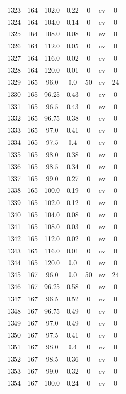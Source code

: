 \documentclass[12pt,a4paper]{article}
\begin{document}
\begin{tabular}{r|cccccc}
	1323 & 164 & 102.0 & 0.22 & 0 & ev & 0 \\
	1324 & 164 & 104.0 & 0.14 & 0 & ev & 0 \\
	1325 & 164 & 108.0 & 0.08 & 0 & ev & 0 \\
	1326 & 164 & 112.0 & 0.05 & 0 & ev & 0 \\
	1327 & 164 & 116.0 & 0.02 & 0 & ev & 0 \\
	1328 & 164 & 120.0 & 0.01 & 0 & ev & 0 \\
	1329 & 165 & 96.0 & 0.0 & 50 & ev & 24 \\
	1330 & 165 & 96.25 & 0.43 & 0 & ev & 0 \\
	1331 & 165 & 96.5 & 0.43 & 0 & ev & 0 \\
	1332 & 165 & 96.75 & 0.38 & 0 & ev & 0 \\
	1333 & 165 & 97.0 & 0.41 & 0 & ev & 0 \\
	1334 & 165 & 97.5 & 0.4 & 0 & ev & 0 \\
	1335 & 165 & 98.0 & 0.38 & 0 & ev & 0 \\
	1336 & 165 & 98.5 & 0.34 & 0 & ev & 0 \\
	1337 & 165 & 99.0 & 0.27 & 0 & ev & 0 \\
	1338 & 165 & 100.0 & 0.19 & 0 & ev & 0 \\
	1339 & 165 & 102.0 & 0.12 & 0 & ev & 0 \\
	1340 & 165 & 104.0 & 0.08 & 0 & ev & 0 \\
	1341 & 165 & 108.0 & 0.03 & 0 & ev & 0 \\
	1342 & 165 & 112.0 & 0.02 & 0 & ev & 0 \\
	1343 & 165 & 116.0 & 0.01 & 0 & ev & 0 \\
	1344 & 165 & 120.0 & 0.0 & 0 & ev & 0 \\
	1345 & 167 & 96.0 & 0.0 & 50 & ev & 24 \\
	1346 & 167 & 96.25 & 0.58 & 0 & ev & 0 \\
	1347 & 167 & 96.5 & 0.52 & 0 & ev & 0 \\
	1348 & 167 & 96.75 & 0.49 & 0 & ev & 0 \\
	1349 & 167 & 97.0 & 0.49 & 0 & ev & 0 \\
	1350 & 167 & 97.5 & 0.41 & 0 & ev & 0 \\
	1351 & 167 & 98.0 & 0.4 & 0 & ev & 0 \\
	1352 & 167 & 98.5 & 0.36 & 0 & ev & 0 \\
	1353 & 167 & 99.0 & 0.32 & 0 & ev & 0 \\
	1354 & 167 & 100.0 & 0.24 & 0 & ev & 0 \\

\end{tabular}
\end{document}
